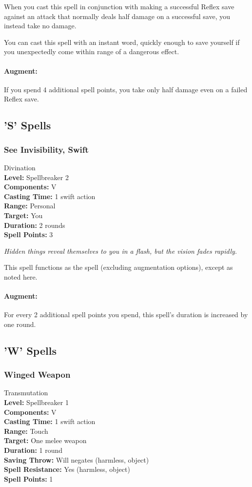 When you cast this spell in conjunction with making a successful Reflex save against an attack that normally deals half damage on a successful save, you instead take no damage.

You can cast this spell with an instant word, quickly enough to save yourself if you unexpectedly come within range of a dangerous effect.

\paragraph{Augment:} If you spend 4 additional spell points, you take only half damage even on a failed Reflex save.
\subsection{'S' Spells}
\subsubsection[Swift See Invisibility]{See Invisibility, Swift}
\label{Spell:SwiftSeeInvisibility}
Divination
\\ \textbf{Level:} Spellbreaker 2
\\ \textbf{Components:} V
\\ \textbf{Casting Time:} 1 swift action
\\ \textbf{Range:} Personal
\\ \textbf{Target:} You
\\ \textbf{Duration:} 2 rounds
\\ \textbf{Spell Points:} 3

\emph{Hidden things reveal themselves to you in a flash, but the vision fades rapidly.}

This spell functions as the  spell (excluding augmentation options), except as noted here.

\paragraph{Augment:} For every 2 additional spell points you spend, this spell's duration is increased by one round.
\subsection{'W' Spells}
\subsubsection{Winged Weapon}
\label{Spell:WingedWeapon}
Transmutation
\\ \textbf{Level:} Spellbreaker 1
\\ \textbf{Components:} V
\\ \textbf{Casting Time:} 1 swift action
\\ \textbf{Range:} Touch
\\ \textbf{Target:} One melee weapon
\\ \textbf{Duration:} 1 round
\\ \textbf{Saving Throw:} Will negates (harmless, object)
\\ \textbf{Spell Resistance:} Yes (harmless, object)
\\ \textbf{Spell Points:} 1

